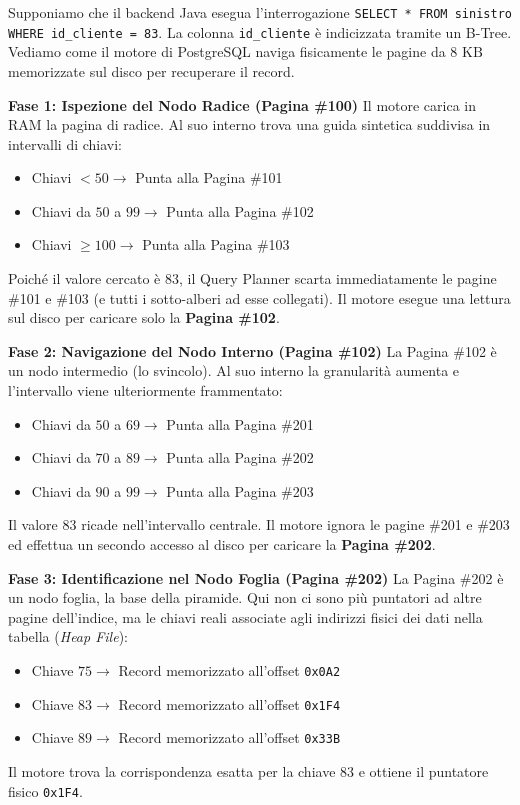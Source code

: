 \begin{example}
Supponiamo che il backend Java esegua l'interrogazione \texttt{SELECT * FROM sinistro WHERE id\_cliente = 83}. La colonna \texttt{id\_cliente} è indicizzata tramite un B-Tree. Vediamo come il motore di PostgreSQL naviga fisicamente le pagine da $8\text{ KB}$ memorizzate sul disco per recuperare il record.

\textbf{Fase 1: Ispezione del Nodo Radice (Pagina \#100)}
Il motore carica in RAM la pagina di radice. Al suo interno trova una guida sintetica suddivisa in intervalli di chiavi:
\begin{itemize}
    \item Chiavi $< 50 \longrightarrow$ Punta alla Pagina \#101
    \item Chiavi da $50$ a $99 \longrightarrow$ Punta alla Pagina \#102
    \item Chiavi $\ge 100 \longrightarrow$ Punta alla Pagina \#103
\end{itemize}
Poiché il valore cercato è $83$, il Query Planner scarta immediatamente le pagine \#101 e \#103 (e tutti i sotto-alberi ad esse collegati). Il motore esegue una lettura sul disco per caricare solo la \textbf{Pagina \#102}.

\textbf{Fase 2: Navigazione del Nodo Interno (Pagina \#102)}
La Pagina \#102 è un nodo intermedio (lo svincolo). Al suo interno la granularità aumenta e l'intervallo viene ulteriormente frammentato:
\begin{itemize}
    \item Chiavi da $50$ a $69 \longrightarrow$ Punta alla Pagina \#201
    \item Chiavi da $70$ a $89 \longrightarrow$ Punta alla Pagina \#202
    \item Chiavi da $90$ a $99 \longrightarrow$ Punta alla Pagina \#203
\end{itemize}
Il valore $83$ ricade nell'intervallo centrale. Il motore ignora le pagine \#201 e \#203 ed effettua un secondo accesso al disco per caricare la \textbf{Pagina \#202}.

\textbf{Fase 3: Identificazione nel Nodo Foglia (Pagina \#202)}
La Pagina \#202 è un nodo foglia, la base della piramide. Qui non ci sono più puntatori ad altre pagine dell'indice, ma le chiavi reali associate agli indirizzi fisici dei dati nella tabella (\textit{Heap File}):
\begin{itemize}
    \item Chiave $75 \longrightarrow$ Record memorizzato all'offset \texttt{0x0A2}
    \item Chiave $83 \longrightarrow$ Record memorizzato all'offset \texttt{0x1F4}
    \item Chiave $89 \longrightarrow$ Record memorizzato all'offset \texttt{0x33B}
\end{itemize}
Il motore trova la corrispondenza esatta per la chiave $83$ e ottiene il puntatore fisico \texttt{0x1F4}.


\end{example}
